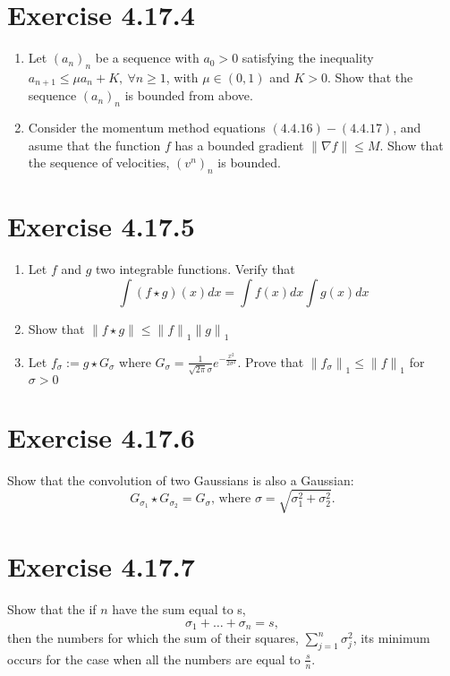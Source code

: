 \documentclass{exam}
\begin{document}
\section*{Exercise 4.17.4}
\begin{enumerate}
   \item Let $(a_n)_{n}$ be a sequence with $a_0 > 0$ satisfying the inequality \\
   $a_{n+1} \leq \mu a_n + K, \ \forall n \geq 1$, with $\mu \in (0,1)$ and $K > 0$. Show that the sequence $(a_n)_{n}$ is bounded from above.
   \item Consider the momentum method equations $(4.4.16)-(4.4.17)$, and asume that the function $f$ has a bounded gradient $\lVert \nabla f \lVert \leq M$. Show that the 
   sequence of velocities, $(v^n)_{n}$ is bounded.
\end{enumerate}

\section*{Exercise 4.17.5}
\begin{enumerate}
   \item  Let $f$ and $g$ two integrable functions. Verify that
            \begin{equation*}
                \int (f \star g) (x) d x  = \displaystyle \int f(x) d x \displaystyle \int g(x) d x 
            \end{equation*}

    \item Show that $\lVert f \star g \lVert \leq {\lVert f \lVert}_{1} {\lVert g \lVert}_{1}$
    \item Let $f_{\sigma} := g \star G_{\sigma}$ where $G_{\sigma} = \frac{1}{\sqrt{2\pi}\sigma}e^{-\frac{x^{2}}{2\sigma^{2}}}$. Prove that ${\lVert f_{\sigma}\lVert}_{1} \leq {\lVert f \lVert}_{1}$ for $\sigma > 0$
\end{enumerate}

\section*{Exercise 4.17.6}
Show that the convolution of two Gaussians is also a Gaussian:\\
\begin{equation*}
    G_{\sigma_{1}} \star G_{\sigma_{2}} = G_{\sigma} \text{, where } \sigma = \sqrt{\sigma_1^{2} + \sigma_2^{2}}.
\end{equation*}

\section*{Exercise 4.17.7}
Show that the if $n$ have the sum equal to s,
\begin{equation*}
    \sigma_{1} + \ldots + \sigma_{n} = s,
\end{equation*}
then the numbers for which the sum of their squares, $\sum_{j=1}^{n} \sigma_{j}^{2}$, its minimum occurs for the case when all the numbers are equal to $\frac{s}{n}.$
\end{document}
